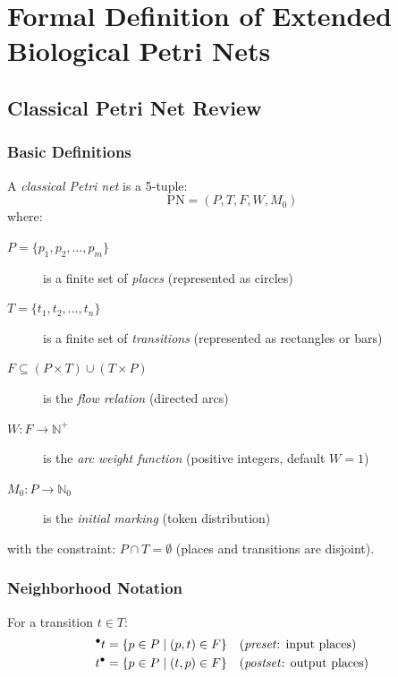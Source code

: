 \chapter{Formal Definition of Extended Biological Petri Nets}
\label{ch:extended-biopn-definition}

\section{Classical Petri Net Review}
\label{sec:classical-petri-net-review}

\subsection{Basic Definitions}
\label{subsec:basic-definitions}

A \emph{classical Petri net} is a 5-tuple:
%
\begin{equation}
\text{PN} = (P, T, F, W, M_0)
\end{equation}
%
where:
\begin{description}
    \item[$P = \{p_1, p_2, \ldots, p_m\}$] is a finite set of \emph{places} (represented as circles)
    \item[$T = \{t_1, t_2, \ldots, t_n\}$] is a finite set of \emph{transitions} (represented as rectangles or bars)
    \item[$F \subseteq (P \times T) \cup (T \times P)$] is the \emph{flow relation} (directed arcs)
    \item[$W: F \to \mathbb{N}^+$] is the \emph{arc weight function} (positive integers, default $W = 1$)
    \item[$M_0: P \to \mathbb{N}_0$] is the \emph{initial marking} (token distribution)
\end{description}
%
with the constraint: $P \cap T = \emptyset$ (places and transitions are disjoint).

\subsection{Neighborhood Notation}
\label{subsec:neighborhood-notation}

For a transition $t \in T$:
\begin{align}
{}^\bullet t &= \{p \in P \mid (p,t) \in F\} && \text{(\emph{preset}: input places)} \\
t^\bullet &= \{p \in P \mid (t,p) \in F\} && \text{(\emph{postset}: output places)}
\end{align}

